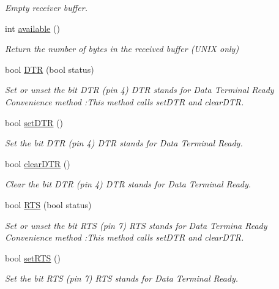\begin{DoxyCompactItemize}
\begin{DoxyCompactList}\small\item\em Empty receiver buffer. \end{DoxyCompactList}\item 
int \hyperlink{classserialib_a50c91bf8cab23afdfdf05ca58392456f}{available} ()
\begin{DoxyCompactList}\small\item\em Return the number of bytes in the received buffer (U\+N\+IX only) \end{DoxyCompactList}\item 
bool \hyperlink{classserialib_a3dc0ec56e84ab2b43dc02fc2e02148a1}{D\+TR} (bool status)
\begin{DoxyCompactList}\small\item\em Set or unset the bit D\+TR (pin 4) D\+TR stands for Data Terminal Ready Convenience method \+:This method calls set\+D\+TR and clear\+D\+TR. \end{DoxyCompactList}\item 
bool \hyperlink{classserialib_a7564b9e28b1b50675d9d6d3fabc896c0}{set\+D\+TR} ()
\begin{DoxyCompactList}\small\item\em Set the bit D\+TR (pin 4) D\+TR stands for Data Terminal Ready. \end{DoxyCompactList}\item 
bool \hyperlink{classserialib_adf49bff6401d3101b41fb52e98309635}{clear\+D\+TR} ()
\begin{DoxyCompactList}\small\item\em Clear the bit D\+TR (pin 4) D\+TR stands for Data Terminal Ready. \end{DoxyCompactList}\item 
bool \hyperlink{classserialib_a5a73f159762fa4d5c252f36acfe7ab47}{R\+TS} (bool status)
\begin{DoxyCompactList}\small\item\em Set or unset the bit R\+TS (pin 7) R\+TS stands for Data Termina Ready Convenience method \+:This method calls set\+D\+TR and clear\+D\+TR. \end{DoxyCompactList}\item 
bool \hyperlink{classserialib_a21767ffe86a76f300a71c496fbcc26a1}{set\+R\+TS} ()
\begin{DoxyCompactList}\small\item\em Set the bit R\+TS (pin 7) R\+TS stands for Data Terminal Ready. \end{DoxyCompactList}\item 

\end{DoxyCompactItemize}
